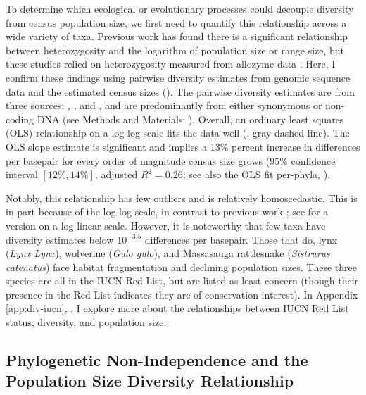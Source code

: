 \documentclass[9pt,lineno]{elife}
\begin{document}
To determine which ecological or evolutionary processes could decouple
diversity from census population size, we first need to quantify this
relationship across a wide variety of taxa. Previous work has found there is a
significant relationship between heterozygosity and the logarithm of population
size or range size, but these studies relied on heterozygosity measured from
allozyme data \citep{Soule1976-he,Frankham1996-yb,Nei1984-zi,Leffler2012-zj}.
Here, I confirm these findings using pairwise diversity estimates from genomic
sequence data and the estimated census sizes ().  The pairwise
diversity estimates are from three sources: \cite{Leffler2012-zj},
\cite{Corbett-Detig2015-gt}, and \cite{Romiguier2014-bp}, and are predominantly
from either synonymous or non-coding DNA (see Methods and Materials:
). Overall, an ordinary least squares (OLS)
relationship on a log-log scale fits the data well (, gray dashed
line). The OLS slope estimate is significant and implies a 13\% percent
increase in differences per basepair for every order of magnitude census size
grows (95\% confidence interval $[12\%, 14\%]$, adjusted $R^2 = 0.26$; see also
the OLS fit per-phyla, ).

Notably, this relationship has few outliers and is relatively homoscedastic.
This is in part because of the log-log scale, in contrast to previous work
\citep{Nei1984-zi,Soule1976-he}; see  for a
version on a log-linear scale. However, it is noteworthy that few taxa have
diversity estimates below $10^{-3.5}$ differences per basepair. Those that do,
lynx (\emph{Lynx Lynx}), wolverine (\emph{Gulo gulo}), and Massasauga
rattlesnake (\emph{Sistrurus catenatus}) face habitat fragmentation and
declining population sizes. These three species are all in the IUCN Red List,
but are listed as least concern (though their presence in the Red List
indicates they are of conservation interest). In Appendix \ref{app:div-iucn},
, I explore more about the relationships between IUCN Red
List status, diversity, and population size.

\subsection{Phylogenetic Non-Independence and the Population Size Diversity Relationship}
\end{document}
